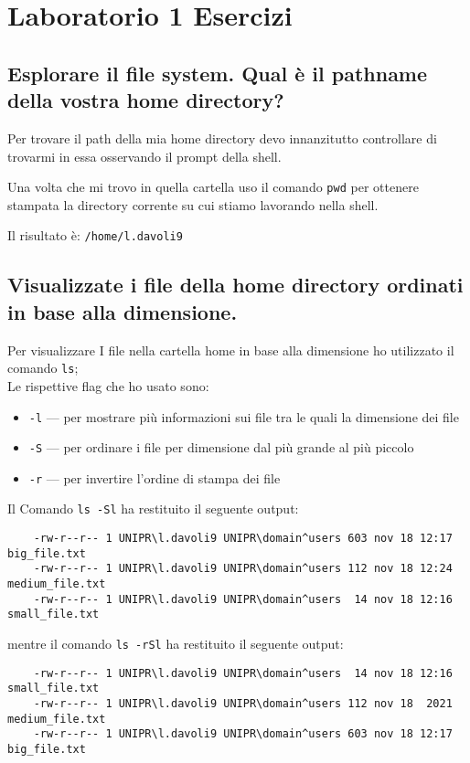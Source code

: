 \documentclass{article}
\begin{document}
\section{Laboratorio 1 Esercizi}

\subsection{Esplorare il file system. Qual è il pathname della vostra home directory?}
Per trovare il path della mia home directory devo innanzitutto controllare di trovarmi in essa osservando il prompt della shell.

Una volta che mi trovo in quella cartella uso il comando \texttt{pwd} 
per ottenere stampata la directory corrente su cui stiamo lavorando nella shell.

Il risultato è: \texttt{/home/l.davoli9}

\subsection{Visualizzate i file della home directory ordinati in base alla dimensione.}
Per visualizzare I file nella cartella home in base alla dimensione ho utilizzato il comando \texttt{ls};\\
Le rispettive flag che ho usato sono:
\begin{itemize}
    \item \texttt{-l} --- per mostrare più informazioni sui file tra le quali la dimensione dei file
    \item \texttt{-S} --- per ordinare i file per dimensione dal più grande al più piccolo
    \item \texttt{-r} --- per invertire l'ordine di stampa dei file
\end{itemize}

Il Comando \texttt{ls -Sl} ha restituito il seguente output:
\begin{verbatim}
    -rw-r--r-- 1 UNIPR\l.davoli9 UNIPR\domain^users 603 nov 18 12:17 big_file.txt
    -rw-r--r-- 1 UNIPR\l.davoli9 UNIPR\domain^users 112 nov 18 12:24 medium_file.txt
    -rw-r--r-- 1 UNIPR\l.davoli9 UNIPR\domain^users  14 nov 18 12:16 small_file.txt
\end{verbatim}
mentre il comando \texttt{ls -rSl} ha restituito il seguente output:
\begin{verbatim}
    -rw-r--r-- 1 UNIPR\l.davoli9 UNIPR\domain^users  14 nov 18 12:16 small_file.txt
    -rw-r--r-- 1 UNIPR\l.davoli9 UNIPR\domain^users 112 nov 18  2021 medium_file.txt
    -rw-r--r-- 1 UNIPR\l.davoli9 UNIPR\domain^users 603 nov 18 12:17 big_file.txt
\end{verbatim}
\end{document}
